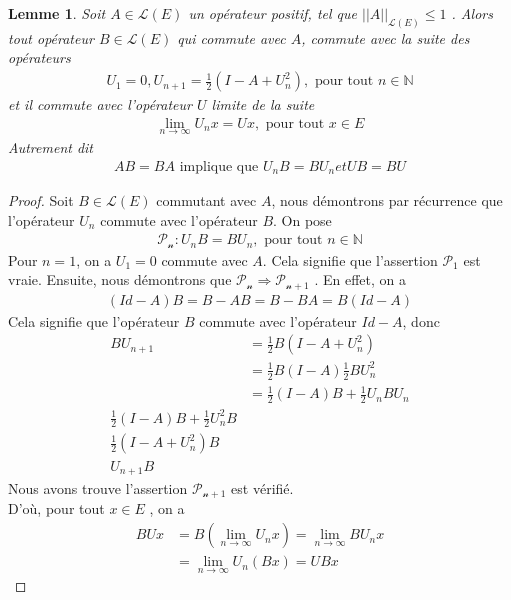 \documentclass{report}
\newtheorem{Lem}{Lemme}[subsection]
\begin{document}
{\begin{Lem} \label{Lem:100} Soit $A \in \mathscr{L}(E)$ un opérateur positif, tel que $||A||_{\mathscr{L}(E)} \le 1$ . Alors tout opérateur $B \in \mathscr{L}(E)$ qui commute avec $A$, commute avec la suite des opérateurs 
									\begin{align*}
					 U_1 = 0       ,       U_{n+1} = \frac{1}{2} (I-A + U_n^2)     ,   \,\,\text{pour tout}\,\, n \in \mathbb{N} 
									\end{align*}
et il commute avec l'opérateur $U$ limite de la suite 
									\begin{align*}
					 \lim_{n\to \infty} U_n x = U x  , \,\,\text{pour tout}\,\, x \in E  
									\end{align*}
Autrement dit 
									\begin{align*}
					 A B = B A \,\,\text{implique que}\,\, U_n B = B U_n et U B = B U 
									\end{align*}
\end{Lem}
\begin{proof}
Soit $B \in \mathscr{L}(E)$ commutant avec $A$, nous démontrons par récurrence que l'opérateur $U_n$ commute avec l'opérateur $B$. On pose 
									\begin{align*}
					 \mathscr{P_n}: U_n B = B U_n     , \,\,\text{pour tout}\,\, n \in \mathbb{N} 
									\end{align*}
Pour $n = 1$, on a $U_1 = 0$ commute avec $A$. Cela signifie que l'assertion $\mathscr{P_1}$ est vraie. Ensuite, nous démontrons que $\mathscr{P_n} \Rightarrow \mathscr{P_{n+1}}$ . En effet, on a 
									\begin{align*}
					 (Id-A)B = B-AB = B-BA = B(Id-A) 
									\end{align*}
Cela signifie que l'opérateur $B$ commute avec l'opérateur $Id-A$, donc 
									\begin{align*}
					 BU_{n+1} &= \frac{1}{2} B(I-A+U_n^2) \\
					 &= \frac{1}{2}B(I-A) \frac{1}{2}B U_n^2 \\
					 &= \frac{1}{2}(I-A)B + \frac{1}{2}U_n B U_n \\
					 \frac{1}{2}(I-A)B + \frac{1}{2}U_n^2 B \\
					 \frac{1}{2} (I-A+U_n^2)B \\
					 U_{n+1} B 
									\end{align*}
Nous avons trouve l'assertion $\mathscr{P_{n+1}}$ est vérifié. \\
D'où, pour tout $x \in E$ , on a 
									\begin{align*}
					 B U x &= B (\lim_{n\to \infty} U_n x) = \lim_{n\to \infty} B U_n x \\
					 &= \lim_{n\to \infty} U_n (B x) = U B x 
									\end{align*}
\end{proof}




}
\end{document}
